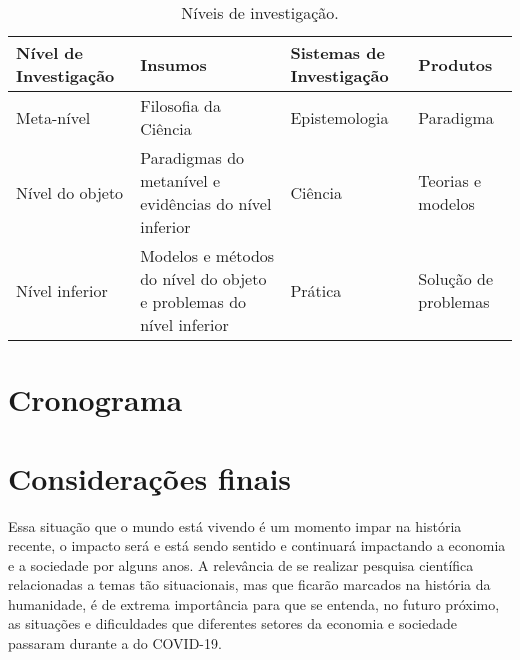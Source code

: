 \documentclass[
	arial,
	12pt,				%
	openright,			%
	twoside,			%
	a4paper,			%
	chapter=TITLE,		%
	english,			%
	french,				%
	spanish,			%
	brazil,				%
	]{abntex2}
\begin{document}
\begin{table}[htb]
\ABNTEXfontereduzida
\caption[Níveis de investigação]{Níveis de investigação.}
\label{tab-nivinv}
\begin{tabular}{p{2.6cm}|p{6.0cm}|p{2.25cm}|p{3.40cm}}
   \textbf{Nível de Investigação} & \textbf{Insumos}  & \textbf{Sistemas de Investigação}  & \textbf{Produtos}  \\
    \hline
    Meta-nível & Filosofia da Ciência  & Epistemologia &
    Paradigma  \\
    \hline
    Nível do objeto & Paradigmas do metanível e evidências do nível inferior &
    Ciência  & Teorias e modelos \\
    \hline
    Nível inferior & Modelos e métodos do nível do objeto e problemas do nível inferior & Prática & Solução de problemas  \\
\end{tabular}
\end{table}

\chapter{Cronograma}




%


\chapter*[Considerações finais]{Considerações finais}

Essa situação que o mundo está vivendo é um momento impar na história recente, o impacto será e está sendo sentido e continuará impactando a economia e a sociedade por alguns anos. A relevância de se realizar pesquisa científica 
relacionadas a temas tão situacionais, mas que ficarão marcados na história da humanidade, é de extrema importância para que se entenda, no futuro próximo, as situações e dificuldades que diferentes setores da economia e sociedade passaram
durante a  do COVID-19. 
\end{document}
